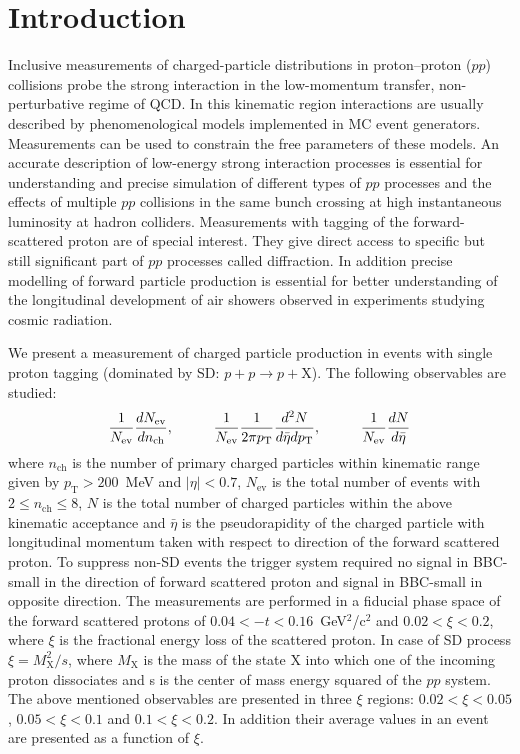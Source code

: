 \chapter{Introduction}\label{chapter:introduction}
Inclusive measurements of charged-particle distributions in proton–proton ($pp$) collisions probe the strong interaction in the low-momentum transfer, non-perturbative regime of \ac{QCD}. In this kinematic region interactions are usually described by phenomenological models implemented in \ac{MC} event generators. Measurements can be used to constrain the free parameters of these models. An accurate description of low-energy strong interaction processes is essential for understanding and precise simulation of different types of $pp$ processes and the effects of multiple $pp$ collisions in the same bunch crossing at high instantaneous luminosity at hadron colliders. Measurements with tagging of the forward-scattered proton are of special interest. They give direct access to specific but still significant part of $pp$ processes called diffraction. In addition precise modelling of forward particle production is essential for better understanding of the longitudinal development of air showers observed in experiments studying cosmic radiation.

We present a measurement of charged particle production in events with single proton tagging (dominated by \ac{SD}: $p+p\to p+\textrm{X}$). The following observables are studied:
\begin{equation}
\frac{1}{N_\textrm{ev}}\frac{dN_\textrm{ev}}{dn_\textrm{ch}},\textrm{\hspace{1cm}} 
\frac{1}{N_\textrm{ev}}\frac{1}{2\pi p_\textrm{T}}\frac{d^2N}{d\bar{\eta}dp_\textrm{T}},\textrm{\hspace{1cm}} 
\frac{1}{N_\textrm{ev}}\frac{dN}{d\bar{\eta}}
\end{equation}
where $n_\textrm{ch}$ is the number of primary charged particles within kinematic range given by $p_\textrm{T}>200$~MeV and $|\eta|<0.7$, $N_\textrm{ev}$ is the 
total number of events with $2\leq n_\textrm{ch}\leq8$, $N$ is the total number of charged particles within the above kinematic acceptance and $\bar{\eta}$ is the pseudorapidity of the charged particle with longitudinal momentum taken with respect to direction of the forward scattered proton. To suppress non-SD events the trigger system required no signal in BBC-small in the direction of forward scattered proton and signal in BBC-small in opposite direction. The 
measurements are performed in a fiducial phase space of the forward scattered protons of $0.04<-t<0.16$~GeV$^2$/c$^2$ and 
$0.02<\xi<0.2$, where $\xi$ is the fractional energy loss of the scattered proton. In case of SD process $\xi=M^2_\textrm{X}/s$, where $M_\textrm{X}$ is 
the mass of the state $\textrm{X}$ into which one of the incoming proton dissociates and s is the center of mass energy squared of the $pp$ system. The above mentioned observables are presented in three $\xi$ 
regions: $0.02<\xi<0.05$, $0.05<\xi<0.1$ and $0.1<\xi<0.2$. In addition their average values in an event are presented as a function of $\xi$.


